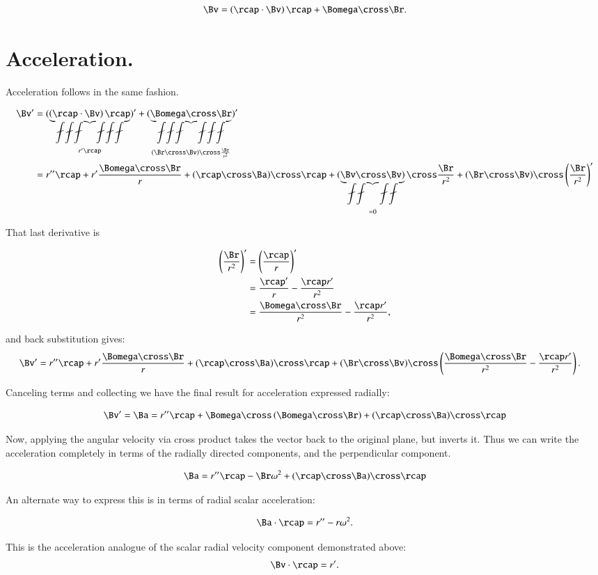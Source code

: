 \[
\Bv = \left(\rcap \cdot \Bv\right) \rcap + \Bomega \cross \Br.
\]

\section{Acceleration. }

Acceleration follows in the same fashion.

\begin{align*}
\Bv'
&= (
\underbrace{\left(\rcap \cdot \Bv\right) \rcap}_{r'\rcap}
)' + (
\underbrace{\Bomega \cross \Br}_
{(\Br \cross \Bv) \cross \frac{\Br}{r^2}}
)' \\
&= r'' \rcap 
 + r' \frac{\Bomega \cross \Br}{r}
 + (\rcap \cross \Ba) \cross \rcap
 + (\underbrace{\Bv \cross \Bv)}_{=0} \cross \frac{\Br}{r^2}
 + (\Br \cross \Bv) \cross \left(\frac{\Br}{r^2}\right)'
\end{align*}

That last derivative is

\begin{align*}
\left(\frac{\Br}{r^2}\right)' 
&= \left(\frac{\rcap}{r}\right)' \\
&= \frac{\rcap'}{r} - \frac{\rcap r'}{r^2} \\
&= \frac{\Bomega \cross \Br}{r^2} - \frac{\rcap r'}{r^2},
\end{align*}

and back substitution gives:
\begin{align*}
\Bv'
&= r'' \rcap 
 + r' \frac{\Bomega \cross \Br}{r}
 + (\rcap \cross \Ba) \cross \rcap
 + (\Br \cross \Bv) \cross \left( \frac{\Bomega \cross \Br}{r^2} - \frac{\rcap r'}{r^2} \right).
\end{align*}

Canceling terms and collecting we have the final result for acceleration expressed radially:

\begin{equation}
\Bv' = \Ba = r'' \rcap + \Bomega \cross \left( {\Bomega \cross \Br} \right) + (\rcap \cross \Ba) \cross \rcap
\end{equation}

Now, applying the angular velocity via cross product takes the vector back to the original plane, but inverts it.  Thus we can write the acceleration completely in terms of the radially directed components, and the perpendicular component.

\begin{equation}
\Ba = r'' \rcap -\Br \omega^2 + (\rcap \cross \Ba) \cross \rcap
\end{equation}

An alternate way to express this is in terms of radial scalar acceleration:

\begin{equation}
\Ba \cdot \rcap = r'' - r\omega^2.
\end{equation}

This is the acceleration analogue of the scalar radial velocity component demonstrated above:
\begin{equation}
\Bv \cdot \rcap = r'.
\end{equation}
